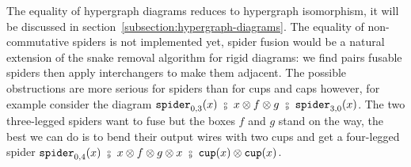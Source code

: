 The equality of hypergraph diagrams reduces to hypergraph isomorphism, it will be discussed in section~\ref{subsection:hypergraph-diagrams}.
The equality of non-commutative spiders is not implemented yet, spider fusion would be a natural extension of the snake removal algorithm for rigid diagrams: we find pairs fusable spiders then apply interchangers to make them adjacent.
The possible obstructions are more serious for spiders than for cups and caps however, for example consider the diagram $\spider_{0, 3}(x) \ \fcmp \ x \otimes f \otimes g \ \fcmp \ \spider_{3, 0}(x)$.
The two three-legged spiders want to fuse but the boxes $f$ and $g$ stand on the way, the best we can do is to bend their output wires with two cups and get a four-legged spider $\spider_{0, 4}(x) \ \fcmp \ x \otimes f \otimes g \otimes x \ \fcmp \ \ttcup(x) \otimes \ttcup(x)$.


